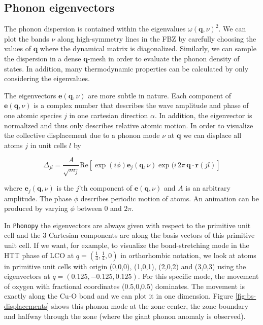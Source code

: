 \subsection{Phonon eigenvectors}
The phonon dispersion is contained within the eigenvalues $\omega (\bm{q},\nu)^2$. We can plot the bands $\nu$ along high-symmetry lines in the FBZ by carefully choosing the values of $\bm{q}$ where the dynamical matrix is diagonalized. Similarly, we can sample the dispersion in a dense $\bm{q}$-mesh in order to evaluate the phonon density of states. In addition, many thermodynamic properties can be calculated by only considering the eigenvalues.

The eigenvectors $\bm{e}(\bm{q}, \nu)$ are more subtle in nature. Each component of  $\bm{e}(\bm{q}, \nu)$ is a complex number that describes the wave amplitude and phase of one atomic species $j$ in one cartesian direction $\alpha$. In addition, the eigenvector is normalized and thus only describes relative atomic motion. In order to visualize the collective displacement due to a phonon mode $\nu$ at $\bm{q}$ we can displace all atoms $j$ in unit cells $l$ by

\begin{equation}
\Delta_{jl} = \frac{A}{\sqrt{m_j}} \text{Re} \left[ \exp (i\phi) \bm{e}_j(\bm{q}, \nu) \exp (i \, 2 \pi \, \bm{q} \cdot \bm{r}(jl) \right] \label{eq:displacements}
\end{equation}

\noindent where $\bm{e}_j(\bm{q}, \nu)$ is the $j$'th component of $\bm{e}(\bm{q}, \nu)$ and $A$ is an arbitrary amplitude. The phase $\phi$ describes periodic motion of atoms. An animation can be produced by varying $\phi$ between 0 and $2 \pi$.

In \texttt{Phonopy} the eigenvectors are always given with respect to the primitive unit cell and the 3 Cartesian components are along the basis vectors of this primitive unit cell. If we want, for example, to visualize the bond-stretching mode in the HTT phase of LCO at $q=(\frac{1}{4},\frac{1}{4},0)$ in orthorhombic notation, we look at atoms in primitive unit cells with origin (0,0,0), (1,0,1), (2,0,2) and (3,0,3) using the eigenvectors at $q=(0.125,-0.125,0.125)$. For this specific mode, the movement of oxygen with fractional coordinates (0.5,0,0.5) dominates. The movement is exactly along the Cu-O bond and we can plot it in one dimension. Figure \ref{fig:bs-displacements} shows this phonon mode at the zone center, the zone boundary and halfway through the zone (where the giant phonon anomaly is observed).

